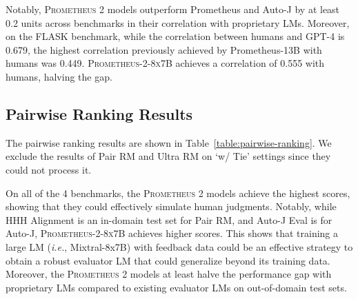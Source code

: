 \documentclass[11pt]{article}
\begin{document}
Notably, \textsc{Prometheus 2} models outperform Prometheus and Auto-J by at least 0.2 units across benchmarks in their correlation with proprietary LMs. Moreover, on the FLASK benchmark, while the correlation between humans and GPT-4 is 0.679, the highest correlation previously achieved by Prometheus-13B with humans was 0.449. \textsc{Prometheus-2-8x7B} achieves a correlation of 0.555 with humans, halving the gap.

\subsection{Pairwise Ranking Results}\label{sec:pairwise_ranking}
The pairwise ranking results are shown in Table~\ref{table:pairwise-ranking}. We exclude the results of Pair RM and Ultra RM on `w/ Tie' settings since they could not process it. 

On all of the 4 benchmarks, the \textsc{Prometheus 2} models achieve the highest scores, showing that they could effectively simulate human judgments. Notably, while HHH Alignment is an in-domain test set for Pair RM, and Auto-J Eval is for Auto-J, \textsc{Prometheus-2-8x7B} achieves higher scores. This shows that training a large LM (\textit{i.e.}, Mixtral-8x7B) with feedback data could be an effective strategy to obtain a robust evaluator LM that could generalize beyond its training data. Moreover, the \textsc{Prometheus 2} models at least halve the performance gap with proprietary LMs compared to existing evaluator LMs on out-of-domain test sets.
\end{document}
